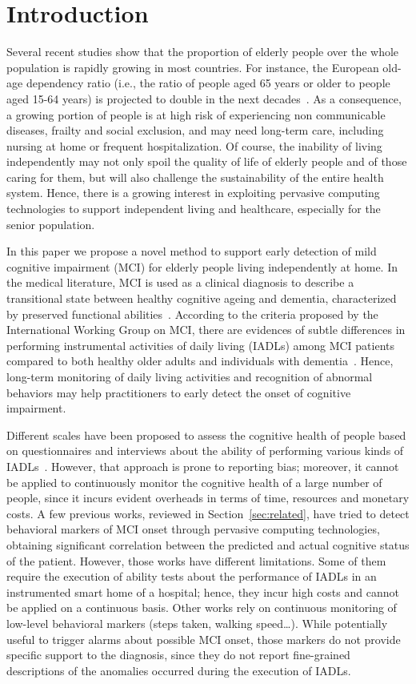 \documentclass[10pt, conference, compsocconf]{IEEEtran}
\begin{document}
\section{Introduction}
\label{sec:introduction}
Several recent studies show that the proportion of elderly people over the whole population is rapidly growing in most countries. For instance, the European old-age dependency ratio (i.e., the ratio of people aged 65 years or older to people aged 15-64 years) is projected to double in the next decades~\cite{lancet13}. As a consequence, a growing portion of people is at high risk of experiencing non communicable diseases, frailty and social exclusion, and may need long-term care, including nursing at home or frequent hospitalization. Of course, the inability of living independently may not only spoil the quality of life of elderly people and of those caring for them, but will also challenge the sustainability of the entire health system. Hence, there is a growing interest in exploiting pervasive computing technologies to support independent living and healthcare, especially for the senior population.

In this paper we propose a novel method to support early detection of mild cognitive impairment (MCI) for elderly people living independently at home. In the medical literature, MCI is used as a clinical diagnosis to describe a transitional state between healthy cognitive ageing and dementia, characterized by preserved functional abilities~\cite{PSW99}. According to the criteria proposed by the International Working Group on MCI, there are evidences of subtle differences in performing instrumental activities of daily living (IADLs) among MCI patients compared to both healthy older adults and individuals with dementia~\cite{WPK04}. Hence, long-term monitoring of daily living activities and recognition of abnormal behaviors may help practitioners to early detect the onset of cognitive impairment. 

Different scales have been proposed to assess the cognitive health of people based on questionnaires and interviews about the ability of performing various kinds of IADLs~\cite{scales}. However, that approach is prone to reporting bias; moreover, it cannot be applied to continuously monitor the cognitive health of a large number of people, since it incurs evident overheads in terms of time, resources and monetary costs. A few previous works, reviewed in Section~\ref{sec:related}, have tried to detect behavioral markers of MCI onset through pervasive computing technologies, obtaining significant correlation between the predicted and actual cognitive status of the patient. However, those works have different limitations. Some of them require the execution of ability tests about the performance of IADLs in an instrumented smart home of a hospital; hence, they incur high costs and cannot be applied on a continuous basis. Other works rely on continuous monitoring of low-level behavioral markers (steps taken, walking speed\ldots). While potentially useful to trigger alarms about possible MCI onset, those markers do not provide specific support to the diagnosis, since they do not report fine-grained descriptions of the anomalies occurred during the execution of IADLs.
\end{document}
